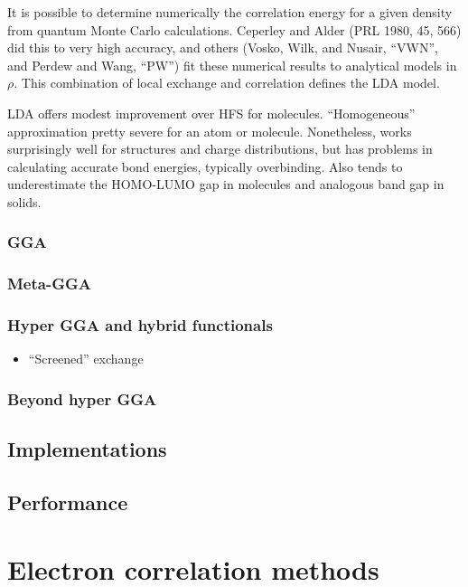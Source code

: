 \documentclass[11pt]{article}
\begin{document}
It is possible to determine numerically the correlation energy for a given
density from quantum Monte Carlo calculations. Ceperley and Alder (PRL 1980,
45, 566) did this to very high accuracy, and others (Vosko, Wilk, and Nusair,
``VWN'', and Perdew and Wang, ``PW'') fit these numerical results to analytical
models in \(\rho\). This combination of local exchange and correlation defines the LDA
model.

LDA offers modest improvement over HFS for molecules. ``Homogeneous''
approximation pretty severe for an atom or molecule. Nonetheless, works
surprisingly well for structures and charge distributions, but has problems in
calculating accurate bond energies, typically overbinding. Also tends to
underestimate the HOMO-LUMO gap in molecules and analogous band gap in solids.

\subsubsection{GGA}
\label{sec:org4674c01}

\subsubsection{Meta-GGA}
\label{sec:orgb92834c}

\subsubsection{Hyper GGA and hybrid functionals}
\label{sec:org1309360}

\begin{itemize}
\item ``Screened'' exchange
\label{sec:orgf77fcf3}
\end{itemize}

\subsubsection{Beyond hyper GGA}
\label{sec:org0ed890e}

\subsection{Implementations}
\label{sec:orgf2766f1}

\subsection{Performance}
\label{sec:orgd8ac5f5}
\newpage
\newpage
\section{Electron correlation methods}
\label{sec:org083329d}
\newpage
\end{document}
